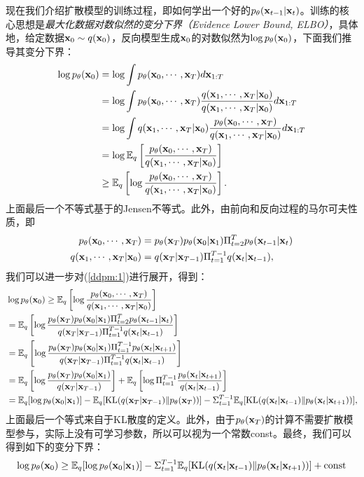 \documentclass[11pt,a4paper,UTF8]{ctexart}
\begin{document}
现在我们介绍扩散模型的训练过程，即如何学出一个好的$p_{\theta}(\mathbf{x}_{t-1}|\mathbf{x}_t)$。训练的核心思想是\emph{最大化数据对数似然的变分下界（Evidence Lower Bound, ELBO）}，具体地，给定数据$\mathbf{x}_0\sim q(\mathbf{x}_0)$，反向模型生成$\mathbf{x}_0$的对数似然为$\log p_{\theta}(\mathbf{x}_0)$，下面我们推导其变分下界：
\begin{align}
\begin{split}
    \log p_{\theta}(\mathbf{x}_0) &= \log \int p_{\theta}(\mathbf{x}_0,\cdots,\mathbf{x}_T)d\mathbf{x}_{1:T} \\
    &= \log \int p_{\theta}(\mathbf{x}_0,\cdots,\mathbf{x}_T)\frac{q(\mathbf{x}_1,\cdots,\mathbf{x}_T|\mathbf{x}_0)}{q(\mathbf{x}_1,\cdots,\mathbf{x}_T|\mathbf{x}_0)}d\mathbf{x}_{1:T} \\
    &= \log \int q(\mathbf{x}_1,\cdots,\mathbf{x}_T|\mathbf{x}_0)\frac{p_{\theta}(\mathbf{x}_0,\cdots,\mathbf{x}_T)}{q(\mathbf{x}_1,\cdots,\mathbf{x}_T|\mathbf{x}_0)}d\mathbf{x}_{1:T} \\
    &= \log \mathbb{E}_q \left[\frac{p_{\theta}(\mathbf{x}_0,\cdots,\mathbf{x}_T)}{q(\mathbf{x}_1,\cdots,\mathbf{x}_T|\mathbf{x}_0)}\right] \\
    & \geq \mathbb{E}_q \left[\log \frac{p_{\theta}(\mathbf{x}_0,\cdots,\mathbf{x}_T)}{q(\mathbf{x}_1,\cdots,\mathbf{x}_T|\mathbf{x}_0)}\right].
\end{split}
\label{ddpm:1}
\end{align}
上面最后一个不等式基于的Jensen不等式。此外，由前向和反向过程的马尔可夫性质，即
\begin{align*}
    p_{\theta}(\mathbf{x}_0,\cdots,\mathbf{x}_T) &= p_{\theta}(\mathbf{x}_T)p_{\theta}(\mathbf{x}_0|\mathbf{x}_1)\Pi_{t=2}^T p_{\theta}(\mathbf{x}_{t-1}|\mathbf{x}_t) \\
    q(\mathbf{x}_1,\cdots,\mathbf{x}_T|\mathbf{x}_0) &= q(\mathbf{x}_T|\mathbf{x}_{T-1})\Pi_{t=1}^{T-1}q(\mathbf{x}_t|\mathbf{x}_{t-1}),
\end{align*}
我们可以进一步对(\ref{ddpm:1})进行展开，得到：
\begin{align}
\begin{split}
    &\log p_{\theta}(\mathbf{x}_0) \geq \mathbb{E}_q \left[\log \frac{p_{\theta}(\mathbf{x}_0,\cdots,\mathbf{x}_T)}{q(\mathbf{x}_1,\cdots,\mathbf{x}_T|\mathbf{x}_0)}\right] \\
    &= \mathbb{E}_q \left[\log\frac{p_{\theta}(\mathbf{x}_T)p_{\theta}(\mathbf{x}_0|\mathbf{x}_1)\Pi_{t=2}^T p_{\theta}(\mathbf{x}_{t-1}|\mathbf{x}_t)}{q(\mathbf{x}_T|\mathbf{x}_{T-1})\Pi_{t=1}^{T-1}q(\mathbf{x}_t|\mathbf{x}_{t-1})} \right] \\
    &= \mathbb{E}_q \left[\log\frac{p_{\theta}(\mathbf{x}_T)p_{\theta}(\mathbf{x}_0|\mathbf{x}_1)\Pi_{t=1}^{T-1} p_{\theta}(\mathbf{x}_{t}|\mathbf{x}_{t+1})}{q(\mathbf{x}_T|\mathbf{x}_{T-1})\Pi_{t=1}^{T-1}q(\mathbf{x}_t|\mathbf{x}_{t-1})} \right] \\
    &= \mathbb{E}_q\left[\log\frac{p_{\theta}(\mathbf{x}_T)p_{\theta}(\mathbf{x}_0|\mathbf{x}_1)}{q(\mathbf{x}_T|\mathbf{x}_{T-1})} \right] + \mathbb{E}_q\left[\log\Pi_{t=1}^{T-1}\frac{p_{\theta}(\mathbf{x}_{t}|\mathbf{x}_{t+1})}{q(\mathbf{x}_t|\mathbf{x}_{t-1})} \right] \\
    &= \mathbb{E}_q[\log p_{\theta}(\mathbf{x}_0|\mathbf{x}_1)] - \mathbb{E}_q[\text{KL}(q(\mathbf{x}_T|\mathbf{x}_{T-1}) \| p_{\theta}(\mathbf{x}_T))] -\Sigma_{t=1}^{T-1}\mathbb{E}_q[\text{KL}(q(\mathbf{x}_t|\mathbf{x}_{t-1}) \| p_{\theta}(\mathbf{x}_{t}|\mathbf{x}_{t+1}))],
\end{split}
\label{ddpm:2}
\end{align}
上面最后一个等式来自于KL散度的定义。此外，由于$p_{\theta}(\mathbf{x}_T)$的计算不需要扩散模型参与，实际上没有可学习参数，所以可以视为一个常数const。最终，我们可以得到如下的变分下界：
\begin{equation}
\log p_{\theta}(\mathbf{x}_0) \geq \mathbb{E}_q[\log p_{\theta}(\mathbf{x}_0|\mathbf{x}_1)]  -\Sigma_{t=1}^{T-1}\mathbb{E}_q[\text{KL}(q(\mathbf{x}_t|\mathbf{x}_{t-1}) \| p_{\theta}(\mathbf{x}_{t}|\mathbf{x}_{t+1}))] + \text{const}
\label{ddpm:3}
\end{equation}
\end{document}

